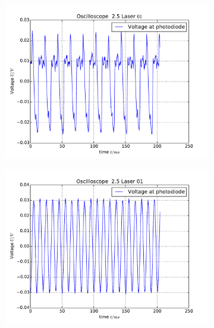 \begin{figure}
    \begin{subfigure}[b]{\picwidth}
        \includegraphics[width=\textwidth]{analysis/figures/25_laser01}
        \caption{}
        \label{fig:laser_a}
    \end{subfigure}
    \begin{subfigure}[b]{\picwidth}
        \includegraphics[width=\textwidth]{analysis/figures/25_no_laser01}
        \caption{}
        \label{fig:laser_b}
    \end{subfigure}


\end{figure}
